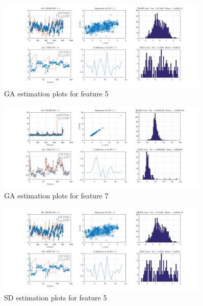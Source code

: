 \documentclass{article}
\begin{document}
\label{lst: GA coefficients function}

\begin{figure}[H]
	\centering
	\includegraphics[width=0.9\textwidth]{pictures/GA_F5_FINAL.png}
	\caption{GA estimation plots for feature 5}\label{fig:GA_F5_FINAL}
\end{figure}

\begin{figure}[H]
	\centering
	\includegraphics[width=0.9\textwidth]{pictures/GA_F7_FINAL.png}
	\caption{GA estimation plots for feature 7}\label{fig:GA_F7_FINAL}
\end{figure}

\label{lst: SD coefficients function}

\begin{figure}[H]
	\centering
	\includegraphics[width=0.9\textwidth]{pictures/SD_F5_FINAL.png}
	\caption{SD estimation plots for feature 5}\label{fig:SD_F5_FINAL}
\end{figure}
\end{document}
